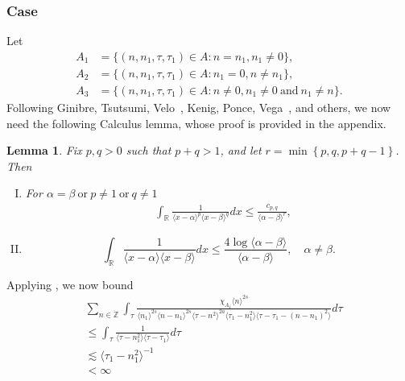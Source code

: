 \documentclass[12pt,reqno]{amsart}
\numberwithin{equation}{section}  %
\renewcommand{\cref}{\Cref}
\newcommand{\rr}{\mathbb{R}}
\newcommand{\zz}{\mathbb{Z}}
\newcommand{\zzdot}{\dot{\zz}}
\newtheorem{lemma}[theorem]{Lemma}
\begin{document}
 \subsubsection{Case \cref{it-6}} 
\label{ssec:case-it-6}
Let 
%
%
\begin{align*}
  A_1&=\{(n, n_1, \tau, \tau_1)\in A: n = n_{1},  n_{1} \neq 0 \},\\
  A_2&=\{(n, n_1, \tau, \tau_1)\in A: n_1=0, n \neq n_{1} \},\\
A_3&=\{(n, n_1, \tau, \tau_1)\in A: n \neq 0, n_1 \neq 0 \ \text{and} \ n_1 \neq n \}.
\end{align*} 
%
%
%
Following Ginibre, Tsutsumi, Velo~\cite{Ginibre:1997fk}, Kenig, Ponce, Vega~\cite{Kenig:1996aa}, and others,
we now need the following Calculus lemma, whose proof is provided in the
appendix.
%
%
%
%
%
%
%
\begin{lemma}
	\label{lem:calc}
 Fix $p, q > 0$ such that $p +q >1$, and let $r =\min\left\{p, q, p+q-1
 \right\}$. Then 
 \begin{enumerate}[(I)]
   \item
For $\alpha=\beta \ \text{or} \ p \neq 1 \ \text{or} \ q \neq 1$
 \begin{equation*}
\begin{split}
  & \int_{\rr} \frac{1}{\langle x - \alpha \rangle ^{p} \langle x -
  \beta \rangle
  ^{q}} d x
  \le \frac{c_{p,q}}{\langle \alpha - \beta \rangle ^{r}}, 
  \end{split}
\end{equation*}
  \item
    \begin{equation*}
  \int_{\rr} \frac{1}{\langle x - \alpha \rangle  \langle x - \beta
  \rangle} d x
  \le  \frac{4 \log \langle \alpha - \beta \rangle}{\langle \alpha - \beta
  \rangle}, \quad \alpha \neq \beta.
\end{equation*}
\end{enumerate}
\end{lemma}
%
%
%
%
%
%
Applying \cref{lem:calc}, we now bound 
\begin{equation*}
  \begin{split}
    & 
    \sum_{n \in \zzdot} \int_{\tau} \frac{\chi_{A_{1}}\langle n \rangle ^{2s} }{\langle n_{1} \rangle ^{2s} \langle n-n_{1} \rangle ^{2s} \langle \tau - n^{2} \rangle^{2a} 
    \langle \tau_{1} - n_{1}^{2} \rangle \langle  \tau - \tau_{1} -
    (n - n_{1})^{2} \rangle}
    d \tau 
    \\
    & \le 
    \int_{\tau} \frac{1}{\langle \tau -
      n_{1}^{2} \rangle \langle
  \tau - \tau_{1}\rangle}d \tau
  \\
  & \lesssim 
  \langle \tau_{1} - n_{1}^{2} \rangle ^{-1} 
  \\
  & < \infty
\end{split}
\end{equation*}
\end{document}
